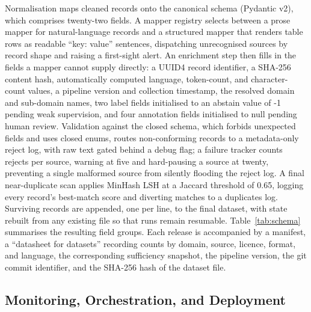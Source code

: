 \documentclass[conference]{IEEEtran}
\begin{document}
Normalisation maps cleaned records onto the canonical schema (Pydantic v2), which comprises twenty-two fields. A mapper registry selects between a prose mapper for natural-language records and a structured mapper that renders table rows as readable ``key: value'' sentences, dispatching unrecognised sources by record shape and raising a first-sight alert. An enrichment step then fills in the fields a mapper cannot supply directly: a UUID4 record identifier, a SHA-256 content hash, automatically computed language, token-count, and character-count values, a pipeline version and collection timestamp, the resolved domain and sub-domain names, two label fields initialised to an abstain value of -1 pending weak supervision, and four annotation fields initialised to null pending human review. Validation against the closed schema, which forbids unexpected fields and uses closed enums, routes non-conforming records to a metadata-only reject log, with raw text gated behind a debug flag; a failure tracker counts rejects per source, warning at five and hard-pausing a source at twenty, preventing a single malformed source from silently flooding the reject log. A final near-duplicate scan applies MinHash LSH at a Jaccard threshold of 0.65, logging every record's best-match score and diverting matches to a duplicates log. Surviving records are appended, one per line, to the final dataset, with state rebuilt from any existing file so that runs remain resumable. Table~\ref{tab:schema} summarises the resulting field groups. Each release is accompanied by a manifest, a ``datasheet for datasets'' recording counts by domain, source, licence, format, and language, the corresponding sufficiency snapshot, the pipeline version, the git commit identifier, and the SHA-256 hash of the dataset file.


\subsection{Monitoring, Orchestration, and Deployment}
\end{document}
